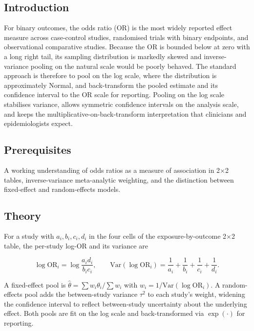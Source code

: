 \documentclass[
]{article}
\author{}
\date{\vspace{-2.5em}}
\begin{document}
\subsection{Introduction}\label{introduction}

For binary outcomes, the odds ratio (OR) is the most widely reported
effect measure across case-control studies, randomised trials with
binary endpoints, and observational comparative studies. Because the OR
is bounded below at zero with a long right tail, its sampling
distribution is markedly skewed and inverse-variance pooling on the
natural scale would be poorly behaved. The standard approach is
therefore to pool on the log scale, where the distribution is
approximately Normal, and back-transform the pooled estimate and its
confidence interval to the OR scale for reporting. Pooling on the log
scale stabilises variance, allows symmetric confidence intervals on the
analysis scale, and keeps the multiplicative-on-back-transform
interpretation that clinicians and epidemiologists expect.

\subsection{Prerequisites}\label{prerequisites}

A working understanding of odds ratios as a measure of association in
2×2 tables, inverse-variance meta-analytic weighting, and the
distinction between fixed-effect and random-effects models.

\subsection{Theory}\label{theory}

For a study with \(a_i, b_i, c_i, d_i\) in the four cells of the
exposure-by-outcome 2×2 table, the per-study log-OR and its variance are

\[\log \mathrm{OR}_i = \log \frac{a_i d_i}{b_i c_i}, \qquad \mathrm{Var}(\log \mathrm{OR}_i) = \frac{1}{a_i} + \frac{1}{b_i} + \frac{1}{c_i} + \frac{1}{d_i}.\]

A fixed-effect pool is \(\hat\theta = \sum w_i \theta_i / \sum w_i\)
with \(w_i = 1/\mathrm{Var}(\log\mathrm{OR}_i)\). A random-effects pool
adds the between-study variance \(\tau^2\) to each study's weight,
widening the confidence interval to reflect between-study uncertainty
about the underlying effect. Both pools are fit on the log scale and
back-transformed via \(\exp(\cdot)\) for reporting.
\end{document}
